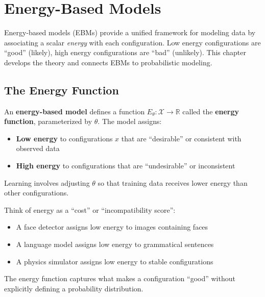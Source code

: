 \chapter{Energy-Based Models}

Energy-based models (EBMs) provide a unified framework for modeling data by associating a scalar \emph{energy} with each configuration. Low energy configurations are ``good'' (likely), high energy configurations are ``bad'' (unlikely). This chapter develops the theory and connects EBMs to probabilistic modeling.

\section{The Energy Function}

\begin{definition}
    An \textbf{energy-based model} defines a function $E_\theta: \mathcal{X} \to \mathbb{R}$ called the \textbf{energy function}, parameterized by $\theta$. The model assigns:
    \begin{itemize}
        \item \textbf{Low energy} to configurations $x$ that are ``desirable'' or consistent with observed data
        \item \textbf{High energy} to configurations that are ``undesirable'' or inconsistent
    \end{itemize}
    Learning involves adjusting $\theta$ so that training data receives lower energy than other configurations.
\end{definition}

\begin{remark}[Intuition]
    Think of energy as a ``cost'' or ``incompatibility score'':
    \begin{itemize}
        \item A face detector assigns low energy to images containing faces
        \item A language model assigns low energy to grammatical sentences
        \item A physics simulator assigns low energy to stable configurations
    \end{itemize}
    The energy function captures what makes a configuration ``good'' without explicitly defining a probability distribution.
\end{remark}

